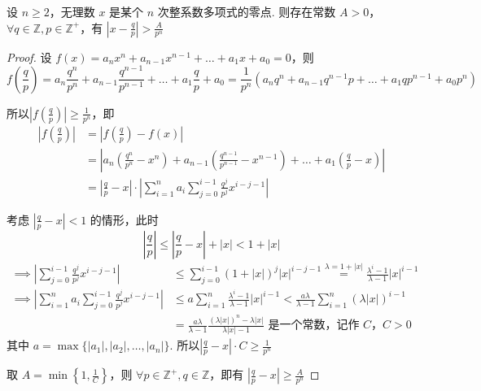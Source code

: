 \begin{theorem}
    设 $n \ge 2$，无理数 $x$ 是某个 $n$ 次整系数多项式的零点. 则存在常数 $A > 0$， $\forall q \in \mathbb{Z}, p \in \mathbb{Z}^+$，有 $\left| x - \frac{q}{p} \right| > \frac{A}{p^n}$
\end{theorem}
\begin{proof}
设 $f(x) = a_n x^n + a_{n-1} x^{n-1} + \dots + a_1 x + a_0 = 0$，则 
$$f\left(\frac{q}{p}\right) = a_n \frac{q^n}{p^n} + a_{n-1} \frac{q^{n-1}}{p^{n-1}} + \dots + a_1 \frac{q}{p} + a_0
= \frac{1}{p^n} \left( a_n q^n + a_{n-1} q^{n-1} p + \dots + a_1 q p^{n-1} + a_0 p^n \right)$$

所以$\left| f\left(\frac{q}{p}\right) \right| \ge \frac{1}{p^n}$，即 
\begin{align*}
    \left| f\left(\frac{q}{p}\right) \right| &= \left| f\left(\frac{q}{p}\right) - f(x) \right|\\
    &= \left| a_n \left( \frac{q^n}{p^n} - x^n \right) + a_{n-1} \left( \frac{q^{n-1}}{p^{n-1}} - x^{n-1} \right) + \dots + a_1 \left( \frac{q}{p} - x \right) \right| \\
    &= \left| \frac{q}{p} - x \right| \cdot \left| \sum_{i=1}^n a_i \sum_{j=0}^{i-1} \frac{q^j}{p^j} x^{i-j-1} \right|
\end{align*}

考虑 $\left| \frac{q}{p} - x \right| < 1$ 的情形，此时
$$\left| \frac{q}{p} \right| \le \left| \frac{q}{p} - x \right| + |x| < 1 + |x|$$
\begin{align*}
    \implies \left| \sum_{j=0}^{i-1} \frac{q^j}{p^j} x^{i-j-1} \right| &\le \sum_{j=0}^{i-1} (1+|x|)^j |x|^{i-j-1} \overset{\lambda = 1+|x|}{=} \frac{\lambda^i - 1}{\lambda - 1} |x|^{i-1} \\
    \implies \left| \sum_{i=1}^n a_i \sum_{j=0}^{i-1} \frac{q^j}{p^j} x^{i-j-1} \right| &\le a \sum_{i=1}^n \frac{\lambda^i - 1}{\lambda - 1} |x|^{i-1} < \frac{a\lambda}{\lambda - 1} \sum_{i=1}^n (\lambda|x|)^{i-1} \\
    &= \frac{a\lambda}{\lambda - 1} \frac{(\lambda|x|)^n - \lambda|x|}{\lambda|x| - 1} \text{ 是一个常数，记作 } C，C > 0
\end{align*}
其中 $a = \max \{|a_1|, |a_2|, \dots, |a_n|\}$. 所以$ \left| \frac{q}{p} - x \right| \cdot C \ge \frac{1}{p^n}$ 

取 $A = \min \left\{ 1, \frac{1}{C} \right\}$，则 $\forall p \in \mathbb{Z}^+, q \in \mathbb{Z}$，即有 $\left| \frac{q}{p} - x \right| \ge \frac{A}{p^n}$
\end{proof}


